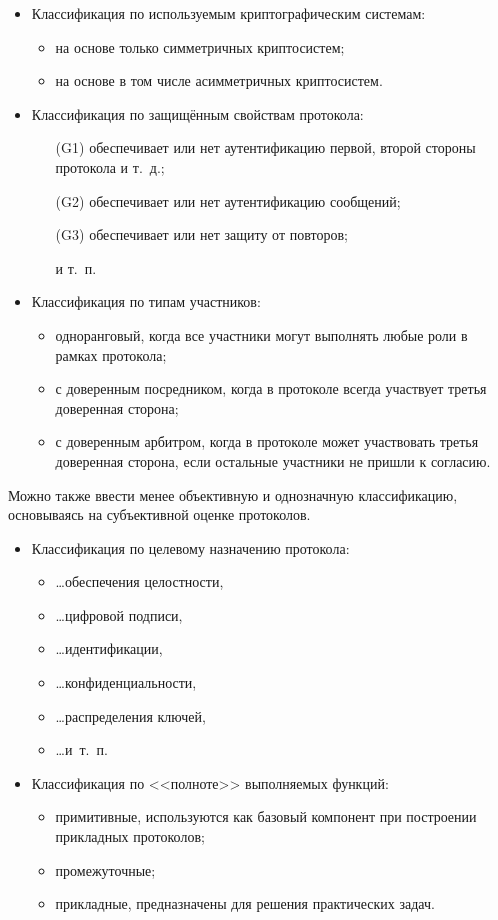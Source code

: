 \begin{itemize}
    \item Классификация по используемым криптографическим системам:
    \begin{itemize}
        \item на основе только симметричных криптосистем;
        \item на основе в том числе асимметричных криптосистем.
    \end{itemize}
    \item Классификация по защищённым свойствам протокола:
    \begin{itemize}
        \item[(G1)] обеспечивает или нет аутентификацию первой, второй стороны протокола и т.~д.;
        \item[(G2)] обеспечивает или нет аутентификацию сообщений;
        \item[(G3)] обеспечивает или нет защиту от повторов;
        \item[{}] и т.~п.
    \end{itemize}
    \item Классификация по типам участников:
    \begin{itemize}
        \item одноранговый, когда все участники могут выполнять любые роли в рамках протокола;
        \item с доверенным посредником, когда в протоколе всегда участвует третья доверенная сторона;
        \item с доверенным арбитром, когда в протоколе может участвовать третья доверенная сторона, если остальные участники не пришли к согласию.
    \end{itemize}
\end{itemize}

Можно также ввести менее объективную и однозначную классификацию, основываясь на субъективной оценке протоколов.
\begin{itemize}
    \item Классификация по целевому назначению протокола:
    \begin{itemize}
        \item \dots обеспечения целостности, 
        \item \dots цифровой подписи, 
        \item \dots идентификации, 
        \item \dots конфиденциальности, 
        \item \dots распределения ключей, 
        \item \dots и~т.~п.
    \end{itemize}
    \item Классификация по <<полноте>> выполняемых функций:
    \begin{itemize}
        \item примитивные, используются как базовый компонент при построении прикладных протоколов;
        \item промежуточные;
        \item прикладные, предназначены для решения практических задач.
    \end{itemize}
\end{itemize}

